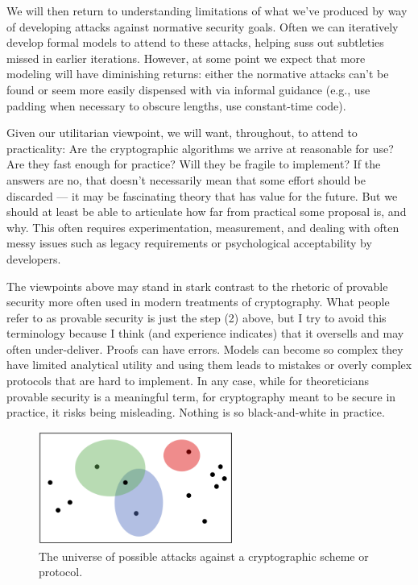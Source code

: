 We will then return to understanding limitations of what we've produced by way
of developing attacks against normative security goals. Often we can iteratively
develop formal models to attend to these attacks, helping suss out subtleties
missed in earlier iterations. However, at some point we expect that more
modeling will have diminishing returns: either the normative attacks can't be
found or seem more
easily dispensed with via informal guidance (e.g., use padding when necessary to
obscure lengths, use constant-time code).

Given our utilitarian viewpoint, we will want, throughout, to attend to practicality: 
Are the cryptographic algorithms
we arrive at reasonable for use? Are they fast enough for practice? 
Will they be fragile to implement? If the answers are no, that doesn't
necessarily mean that some effort should be discarded --- it may be fascinating
theory that has value for the future. But we should at least 
be able to articulate how far from practical some proposal is, and why. This
often requires experimentation, measurement, and dealing with often messy 
issues such as legacy requirements or psychological acceptability by developers.

The viewpoints above may stand in stark contrast to the rhetoric of provable
security more often used in modern treatments of cryptography. What people refer
to as provable security is just the step (2) above, but I try to avoid this
terminology because I think (and experience indicates) that it oversells and may
often under-deliver. Proofs can have errors. Models can become so complex they
have limited analytical utility and using them leads to mistakes or overly
complex protocols that are hard to implement.  In any case, while for
theoreticians provable security is a meaningful term, for cryptography meant to
be secure in practice, it risks being misleading. Nothing is so black-and-white
in practice.

\begin{figure}
\center
\includegraphics[width=2.5in]{venndiagram-cropped.png}
\caption{The universe of possible attacks against a cryptographic scheme or
protocol.} 
\label{fig:venndiagram}
\end{figure}


